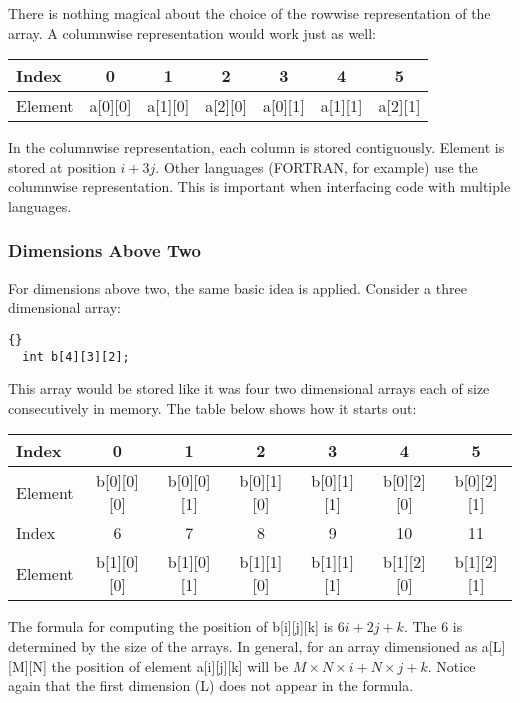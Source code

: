 There is nothing magical about the choice of the rowwise representation of the
array. A columnwise representation would work just as well: 

\parbox{\textwidth}{
\vspace{0.5em}
\centering
\begin{tabular}{||l|c|c|c|c|c|c||}
\hline
Index & 0 & 1 & 2 & 3 & 4 & 5 \\
\hline
Element & a[0][0] & a[1][0] & a[2][0] & a[0][1] & a[1][1] & a[2][1]  \\
\hline
\end{tabular}
\vspace{0.5em}
}
\noindent In the columnwise representation, each column is stored contiguously. 
Element {\code [i][j]} is stored at position $i + 3j$. Other languages
(FORTRAN, for example) use the columnwise representation. This is
important when interfacing code with multiple languages.

\subsubsection{Dimensions Above Two}
For dimensions above two, the same basic idea is applied. Consider a three
dimensional array:
\begin{lstlisting}[stepnumber=0]{}
  int b[4][3][2];
\end{lstlisting}
This array would be stored like it was four two dimensional arrays each of size
{\code [3][2]} consecutively in memory. The table below shows how it starts out:

\parbox{\textwidth}{
\vspace{0.5em}
\centering
\begin{tabular}{||l|c|c|c|c|c|c||}
\hline
Index & 0 & 1 & 2 & 3 & 4 & 5  \\
\hline
Element & b[0][0][0] & b[0][0][1]  & b[0][1][0] & b[0][1][1] & b[0][2][0]
&  b[0][2][1]  \\
\hline
\hline
Index & 6 & 7 & 8 & 9 & 10 & 11 \\
\hline
Element & b[1][0][0] & b[1][0][1] & b[1][1][0] & b[1][1][1]  & b[1][2][0] 
& b[1][2][1] \\
\hline
\end{tabular}
\vspace{0.5em}
}
\noindent The formula for computing the position of {\code b[i][j][k]}
is $6i + 2j + k$. The 6 is determined by the size of the {\code
[3][2]} arrays. In general, for an array dimensioned as {\code
a[L][M][N]} the position of element {\code a[i][j][k]} will be $M\times N\times i 
+ N \times j + k$. Notice again that the first
dimension ({\code L}) does not appear in the formula.

